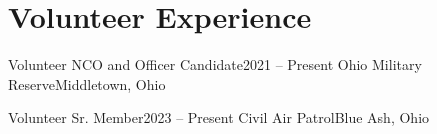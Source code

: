 
\section{Volunteer Experience}
  \resumeSubHeadingListStart

    \resumeSubheading
      {Volunteer NCO and Officer Candidate}{2021 -- Present}
      {Ohio Military Reserve}{Middletown, Ohio}
      
    \resumeSubheading
      {Volunteer Sr. Member}{2023 -- Present}
      {Civil Air Patrol}{Blue Ash, Ohio}
      
  \resumeSubHeadingListEnd

